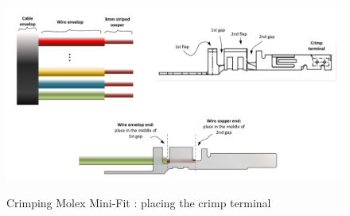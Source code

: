 \begin{figure}
  \centering
  \includegraphics[angle=90,width=1\columnwidth]{figs/body03/FIGCRIMPmini5.pdf}\\
  \caption[Crimping Molex Mini-Fit \textregistered: placing the crimp terminal]{Crimping Molex Mini-Fit \textregistered: placing the crimp terminal}
  \label{FIG:CRIMPmicro5}
\end{figure}
